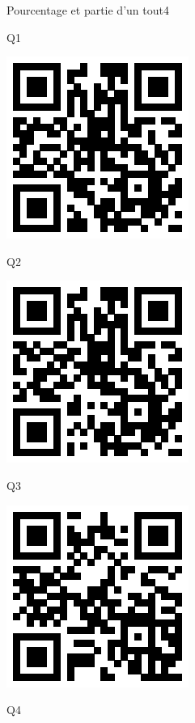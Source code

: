 \documentclass[a4paper,11pt]{report}
\begin{document}
\begin{qmoodle}{Pourcentage et partie d'un tout}{4}{
	\begin{center}
		Q1

		\includegraphics[scale=1]{img/no3fractions/ptpq/ptpq_1}
	\end{center}
	\begin{center}
		Q2

		\includegraphics[scale=1]{img/no3fractions/ptpq/ptpq_2}
	\end{center}
	\begin{center}
		Q3

		\includegraphics[scale=1]{img/no3fractions/ptpq/ptpq_3}
	\end{center}
	\begin{center}
		Q4


\end{center}}
\end{qmoodle}
\end{document}
